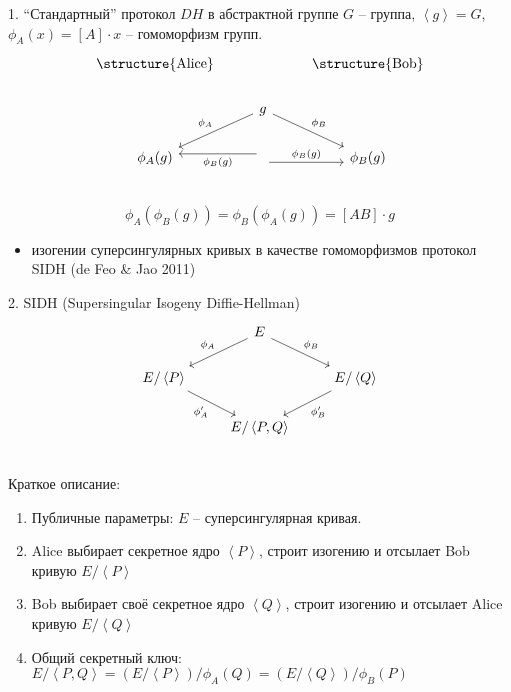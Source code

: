 \documentclass{beamer}
\begin{document}
\begin{frame}[fragile]{1. ``Стандартный'' протокол $DH$ в абстрактной группе}
$G$ -- группа, $\left<g\right> = G$, $\phi_A(x) = [A] \cdot x$ -- гомоморфизм групп.
\[
\begin{tikzcd}
  \text{\structure{Alice}} & & \text{\structure{Bob}} \\
  & \arrow{ld}[swap]{\phi_A} g \arrow{rd}{\phi_B}  \\
  \phi_A(g) & \arrow[yshift=-0.7ex]{r}{\phi_B(g)} \arrow[yshift=0.7ex]{l}{\phi_B(g)}  & \phi_B(g)\\
\end{tikzcd}
\]
\[
\phi_A(\phi_B(g)) = \phi_B(\phi_A(g)) = [A B]\cdot g
\]
\begin{itemize}
\item изогении суперсингулярных кривых в качестве гомоморфизмов \structure{$\Rightarrow$} протокол SIDH (de Feo \& Jao 2011)
\end{itemize}
\end{frame}

\begin{frame}[fragile]{2. SIDH (Supersingular Isogeny Diffie-Hellman)}
    \[
    \begin{tikzcd}
        &\arrow{ld}[swap]{\phi_{A}} E  \arrow{rd}{\phi_{B}} & \\
        E/\left<P\right>\arrow{rd}[swap]{\phi'_{A}}  &  & \arrow{ld}{\phi'_{B}}  E/\left< Q \right> \\
        & E/\left< P, Q \right> &\\
    \end{tikzcd}
    \]
    Краткое описание:
    \begin{enumerate}
        \item Публичные параметры: $E$ -- суперсингулярная кривая.
        \item Alice выбирает секретное ядро $\left<P\right>$, строит изогению и отсылает Bob кривую
        $E/\left<P\right>$
        \item Bob выбирает своё секретное ядро $\left<Q\right>$, строит изогению и отсылает Alice кривую
        $E/\left<Q\right>$
        \item Общий секретный ключ: $E/\left<P,Q\right> = (E/\left<P\right>)/\phi_A(Q) = (E/\left<Q\right>)/\phi_B(P)$
    \end{enumerate}
\end{frame}
\end{document}
